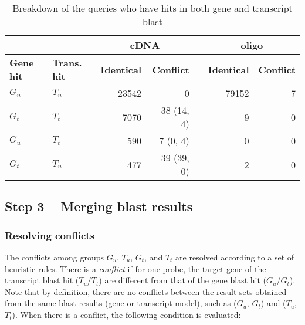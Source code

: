 \begin{table}[tb]
	\centering
	\begin{footnotesize}
	\caption{Breakdown of the queries who have hits in both gene and transcript 
		blast} 
	\label{tab:magic-identicalmaps}
	\begin{tabular}{@{}>{\centering\arraybackslash}p{1.7cm}
	>{\centering\arraybackslash}p{2cm} rrcrr}
	\toprule

	 &  &  \multicolumn{2}{c}{\textbf{cDNA}} & \phantom{a} & 
	\multicolumn{2}{c}{\textbf{oligo}} \\

	\cmidrule{3-4} \cmidrule{6-7}

	\textbf{Gene hit} & \textbf{Trans. hit} &
	\textbf{Identical} & \textbf{Conflict} 
	&& 
	\textbf{Identical} & \textbf{Conflict}  \\
	
	\midrule
	
	$G_u$ & $T_u$ & 23542 & 0 && 79152 & 7 \\
	$G_t$ & $T_t$ & 7070 & 38 (14, 4) && 9 & 0 \\
	$G_u$ & $T_t$ & 590 & 7 (0, 4) && 0 & 0 \\
	$G_t$ & $T_u$ & 477 & 39 (39, 0) && 2 & 0 \\
	
%

	\bottomrule
	\end{tabular}
	\end{footnotesize}
\end{table}



\subsection{Step 3 – Merging blast results}



\subsubsection{Resolving conflicts}\label{apd:magic-conflict}

The conflicts among groups $G_u$, $T_u$, $G_t$, and $T_t$ are resolved 
according to a set of heuristic rules. 
There is a \textit{conflict} if for one probe, the target gene of the 
transcript blast hit ($T_u$/$T_t$) are different from that of the gene blast 
hit ($G_u$/$G_t$). 
Note that by definition, there are no conflicts between the result sets 
obtained from the same blast results (gene or transcript model), such as 
($G_u$, $G_t$) and ($T_u$, $T_t$). 
When there is a conflict, the following condition is evaluated: 

